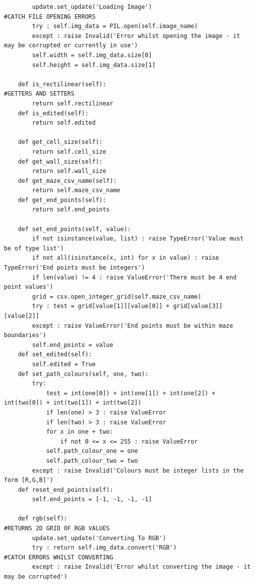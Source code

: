 \documentclass[titlepage]{article}
\begin{document}
\begin{changemargin}{-1in}{-1in}
\begin{verbatim}
        update.set_update('Loading Image')                                      #CATCH FILE OPENING ERRORS
        try : self.img_data = PIL.open(self.image_name)
        except : raise Invalid('Error whilst opening the image - it may be corrupted or currently in use')
        self.width = self.img_data.size[0]
        self.height = self.img_data.size[1]

    def is_rectilinear(self):                                                   #GETTERS AND SETTERS
        return self.rectilinear
    def is_edited(self):
        return self.edited

    def get_cell_size(self):
        return self.cell_size
    def get_wall_size(self):
        return self.wall_size
    def get_maze_csv_name(self):
        return self.maze_csv_name
    def get_end_points(self):
        return self.end_points

    def set_end_points(self, value):
        if not isinstance(value, list) : raise TypeError('Value must be of type list')
        if not all(isinstance(x, int) for x in value) : raise TypeError('End points must be integers')
        if len(value) != 4 : raise ValueError('There must be 4 end point values')
        grid = csv.open_integer_grid(self.maze_csv_name)
        try : test = grid[value[1]][value[0]] + grid[value[3]][value[2]]
        except : raise ValueError('End points must be within maze boundaries')
        self.end_points = value
    def set_edited(self):
        self.edited = True
    def set_path_colours(self, one, two):
        try:
            test = int(one[0]) + int(one[1]) + int(one[2]) + int(two[0]) + int(two[1]) + int(two[2])
            if len(one) > 3 : raise ValueError
            if len(two) > 3 : raise ValueError
            for x in one + two:
                if not 0 <= x <= 255 : raise ValueError
            self.path_colour_one = one
            self.path_colour_two = two
        except : raise Invalid('Colours must be integer lists in the form [R,G,B]')
    def reset_end_points(self):
        self.end_points = [-1, -1, -1, -1]
        
    def rgb(self):                                                              #RETURNS 2D GRID OF RGB VALUES
        update.set_update('Converting To RGB')                                  
        try : return self.img_data.convert('RGB')                               #CATCH ERRORS WHILST CONVERTING
        except : raise Invalid('Error whilst converting the image - it may be corrupted')
        

\end{verbatim}
\end{changemargin}
\end{document}
